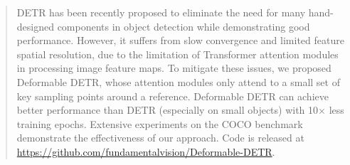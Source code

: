 \begin{abstract}
DETR has been recently proposed to eliminate the need for many hand-designed components in object detection while demonstrating good performance. However, it suffers from slow convergence and limited feature spatial resolution, due to the limitation of Transformer attention modules in processing image feature maps. To mitigate these issues, we proposed Deformable DETR, whose attention modules only attend to a small set of key sampling points around a reference. Deformable DETR can achieve better performance than DETR (especially on small objects) with 10$\times$ less training epochs. Extensive experiments on the COCO benchmark demonstrate the effectiveness of our approach. Code is released at \url{https://github.com/fundamentalvision/Deformable-DETR}.
\end{abstract}